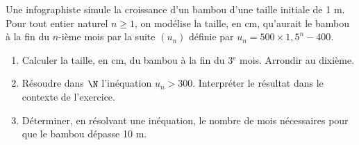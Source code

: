 \documentclass[a4paper,11pt,exos]{nsi} %
\begin{document}
\exo{}
Une infographiste simule la croissance d'un bambou d'une taille initiale de 1 m.\\
Pour tout entier naturel $n\geqslant 1$, on modélise la taille, en cm, qu'aurait le bambou à la fin du $n$-ième mois par la suite $(u_n)$ définie par $u_n=500\times 1,5^n-400$.
\begin{enumerate}
    \item Calculer la taille, en cm, du bambou à la fin du 3$^{\text{e}}$ mois. Arrondir au dixième.
    \item Résoudre dans $\N$ l'inéquation $u_n>300$. Interpréter le résultat dans le contexte de l'exercice.
    \item Déterminer, en résolvant une inéquation, le nombre de mois nécessaires pour que le bambou dépasse 10 m.
\end{enumerate}
\end{document}

